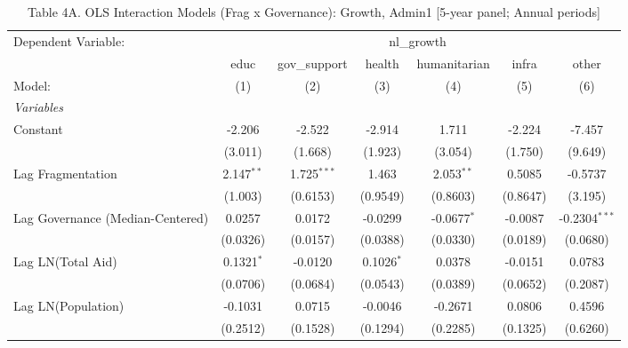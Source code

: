 
\begin{table}[H]
   \caption{Table 4A. OLS Interaction Models (Frag x Governance): Growth, Admin1 [5-year panel; Annual periods]}
   \centering
   \begin{tabular}{lcccccc}
      \tabularnewline \midrule \midrule
      Dependent Variable: & \multicolumn{6}{c}{nl\_growth}\\
                                                           & educ          & gov\_support  & health       & humanitarian  & infra    & other \\   
      Model:                                               & (1)           & (2)           & (3)          & (4)           & (5)      & (6)\\  
      \midrule
      \emph{Variables}\\
      Constant                                             & -2.206        & -2.522        & -2.914       & 1.711         & -2.224   & -7.457\\   
                                                           & (3.011)       & (1.668)       & (1.923)      & (3.054)       & (1.750)  & (9.649)\\   
      Lag Fragmentation                                    & 2.147$^{**}$  & 1.725$^{***}$ & 1.463        & 2.053$^{**}$  & 0.5085   & -0.5737\\   
                                                           & (1.003)       & (0.6153)      & (0.9549)     & (0.8603)      & (0.8647) & (3.195)\\   
      Lag Governance (Median-Centered)                     & 0.0257        & 0.0172        & -0.0299      & -0.0677$^{*}$ & -0.0087  & -0.2304$^{***}$\\   
                                                           & (0.0326)      & (0.0157)      & (0.0388)     & (0.0330)      & (0.0189) & (0.0680)\\   
      Lag LN(Total Aid)                                    & 0.1321$^{*}$  & -0.0120       & 0.1026$^{*}$ & 0.0378        & -0.0151  & 0.0783\\   
                                                           & (0.0706)      & (0.0684)      & (0.0543)     & (0.0389)      & (0.0652) & (0.2087)\\   
      Lag LN(Population)                                   & -0.1031       & 0.0715        & -0.0046      & -0.2671       & 0.0806   & 0.4596\\   
                                                           & (0.2512)      & (0.1528)      & (0.1294)     & (0.2285)      & (0.1325) & (0.6260)\\   

\end{tabular}
\end{table}
